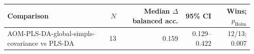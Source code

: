 \begin{tabularx}{\linewidth}{Xrrrr}
\toprule
Comparison & $N$ & Median $\Delta$ balanced acc. & 95\% CI & Wins; $p_{\mathrm{Holm}}$ \\
\midrule
AOM-\allowbreak{}PLS-\allowbreak{}DA-\allowbreak{}global-\allowbreak{}simpls-\allowbreak{}covariance vs PLS-\allowbreak{}DA & 13 & 0.159 & 0.129--0.422 & 12/13; 0.007 \\
\bottomrule
\end{tabularx}
